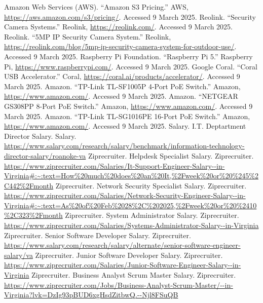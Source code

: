 \documentclass{report}
\begin{document}
\begin{thebibliography}{9}
     Amazon Web Services (AWS). ``Amazon S3 Pricing.'' AWS, \url{https://aws.amazon.com/s3/pricing/}. Accessed 9 March 2025.
     Reolink. ``Security Camera Systems.'' Reolink, \url{https://reolink.com/}. Accessed 9 March 2025.
     Reolink. ``5MP IP Security Camera System.'' Reolink, \url{https://reolink.com/blog/5mp-ip-security-camera-system-for-outdoor-use/}. Accessed 9 March 2025.
     Raspberry Pi Foundation. ``Raspberry Pi 5.'' Raspberry Pi, \url{https://www.raspberrypi.com/}. Accessed 9 March 2025.
     Google Coral. ``Coral USB Accelerator.'' Coral, \url{https://coral.ai/products/accelerator/}. Accessed 9 March 2025.
     Amazon. ``TP-Link TL-SF1005P 4-Port PoE Switch.'' Amazon, \url{https://www.amazon.com/}. Accessed 9 March 2025.
     Amazon. ``NETGEAR GS308PP 8-Port PoE Switch.'' Amazon, \url{https://www.amazon.com/}. Accessed 9 March 2025.
     Amazon. ``TP-Link TL-SG1016PE 16-Port PoE Switch.'' Amazon, \url{https://www.amazon.com/}. Accessed 9 March 2025.
     Salary. I.T. Deptartment Director Salary. Salary. \url{https://www.salary.com/research/salary/benchmark/information-technology-director-salary/roanoke-va}
     Ziprecruiter. Helpdesk Specialist Salary. Ziprecruiter. \url{https://www.ziprecruiter.com/Salaries/It-Support-Engineer-Salary--in-Virginia#:~:text=How%20much%20does%20an%20It,%2Fweek%20or%20%245%2C442%2Fmonth}
     Ziprecruiter. Network Security Specialist Salary. Ziprecruiter. \url{https://www.ziprecruiter.com/Salaries/Network-Security-Engineer-Salary--in-Virginia#:~:text=As%20of%20Feb%2028%2C%202025,%2Fweek%20or%20%2410%2C323%2Fmonth}
     Ziprecruiter. System Administrator Salary. Ziprecruiter. \url{https://www.ziprecruiter.com/Salaries/Systems-Administrator-Salary--in-Virginia}
     Ziprecruiter. Senior Software Developer Salary. Ziprecruiter. \url{https://www.salary.com/research/salary/alternate/senior-software-engineer-salary/va}
     Ziprecruiter. Junior Software Developer Salary. Ziprecruiter. \url{https://www.ziprecruiter.com/Salaries/Junior-Software-Engineer-Salary--in-Virginia}
     Ziprecruiter. Business Analyst Scrum Master  Salary. Ziprecruiter. \url{https://www.ziprecruiter.com/Jobs/Business-Analyst-Scrum-Master/--in-Virginia?lvk=DzIg93pBUD6xgHsdZitbwQ.--Njl8FSuQB}
\end{thebibliography}
\end{document}
